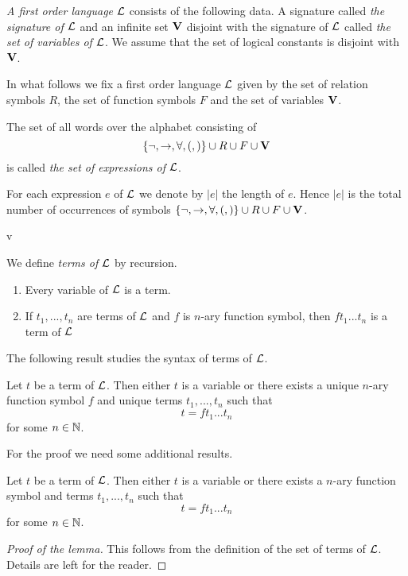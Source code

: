 \documentclass[10pt]{amsart}
\begin{document}
\begin{definition}
	\textit{A first order language ${\mathcal L}$} consists of the following data. A signature called \textit{the signature of ${\mathcal L}$} and an infinite set $\mathbf{V}$ disjoint with the signature of ${\mathcal L}$ called \textit{the set of variables of ${\mathcal L}$}. We assume that the set of logical constants is disjoint with $\mathbf{V}$.
\end{definition}
\noindent
In what follows we fix a first order language ${\mathcal L}$ given by the set of relation symbols $R$, the set of function symbols $F$ and the set of variables $\mathbf{V}$.

\begin{definition}
	The set of all words over the alphabet consisting of
	$$\{\neg, \rightarrow, \forall, (, )\} \cup R \cup F \cup \mathbf{V}$$
	is called \textit{the set of expressions of ${\mathcal L}$}.
\end{definition}
\noindent
For each expression $e$ of ${\mathcal L}$ we denote by $|e|$ the length of $e$. Hence $|e|$ is the total number of occurrences of symbols $\{\neg, \rightarrow, \forall, (, )\} \cup R \cup F \cup \mathbf{V}$.

v\begin{definition}
	We define \textit{terms of ${\mathcal L}$} by recursion.
	\begin{enumerate}[label=\textbf{(\arabic*)}, leftmargin=3.0em]
		\item Every variable of ${\mathcal L}$ is a term.
		\item If $t_1,...,t_n$ are terms of ${\mathcal L}$ and $f$ is $n$-ary function symbol, then $ft_1...t_n$ is a term of ${\mathcal L}$
	\end{enumerate}
\end{definition}
\noindent
The following result studies the syntax of terms of ${\mathcal L}$.

\begin{theorem}\label{theorem:unique_readebility_of_terms}
	Let $t$ be a term of ${\mathcal L}$. Then either $t$ is a variable or there exists a unique $n$-ary function symbol $f$ and unique terms $t_1,...,t_n$ such that
	$$t = ft_1...t_n$$
	for some $n \in {\mathbb N}$.
\end{theorem}
\noindent
For the proof we need some additional results.

\begin{lemma}\label{lemma:term_presentation}
	Let $t$ be a term of ${\mathcal L}$. Then either $t$ is a variable or there exists a $n$-ary function symbol
	and terms $t_1,...,t_n$ such that
	$$t = ft_1...t_n$$
	for some $n\in{\mathbb N}$.
\end{lemma}
\begin{proof}[Proof of the lemma]
	This follows from the definition of the set of terms of ${\mathcal L}$. Details are left for the
	reader.
\end{proof}
\end{document}
